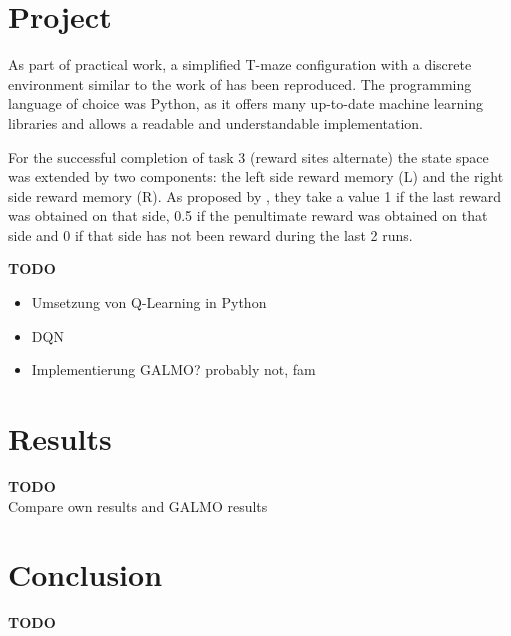 \documentclass[a4paper]{article}
\begin{document}
	\section{Project}
	\label{sec:project}
	As part of practical work, a simplified T-maze configuration with a discrete environment similar to the work of \cite{NeuralDynaQ} has been reproduced. The programming language of choice was Python, as it offers many up-to-date machine learning libraries and allows a readable and understandable implementation.
	\par For the successful completion of task 3 (reward sites alternate) the state space was extended by two components: the left side reward memory (L) and the right side reward memory (R). 
	As proposed by \citet{NeuralDynaQ}, they take a value 1 if the last reward was obtained on that side, 0.5 if the penultimate reward was obtained on that side and 0 if that side has not been reward during the last 2 runs. 
	\par \textbf{TODO}
	\begin{itemize}
		\item Umsetzung von Q-Learning in Python
		\item DQN
		\item Implementierung GALMO? probably not, fam
	\end{itemize}
	
	
	\section{Results}
	\label{sec:results}
	\textbf{TODO}\\
	Compare own results and GALMO results
	
	
	
	\section{Conclusion}
	\label{sec:conclusion}
	\textbf{TODO}
	
	
	\footnotesize
	
	
	
\end{document}
